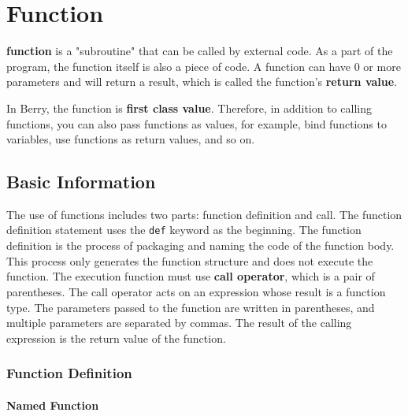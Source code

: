 \chapter {Function}

\textbf{function} is a "subroutine" that can be called by external code. As a part of the program, the function itself is also a piece of code. A function can have 0 or more parameters and will return a result, which is called the function's \textbf{return value}.

In Berry, the function is \textbf{first class value}. Therefore, in addition to calling functions, you can also pass functions as values, for example, bind functions to variables, use functions as return values, and so on.

\section {Basic Information}

The use of functions includes two parts: function definition and call. The function definition statement uses the \texttt{def} keyword as the beginning. The function definition is the process of packaging and naming the code of the function body. This process only generates the function structure and does not execute the function. The execution function must use \textbf{call operator}, which is a pair of parentheses. The call operator acts on an expression whose result is a function type. The parameters passed to the function are written in parentheses, and multiple parameters are separated by commas. The result of the calling expression is the return value of the function.

\subsection {Function Definition}

\subsubsection {Named Function}


